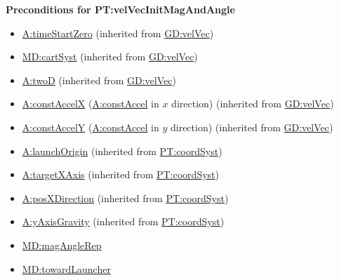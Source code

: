 \documentclass[12pt]{article}
\begin{document}
\noindent \textbf{Preconditions for PT:velVecInitMagAndAngle}
\begin{itemize}
\item \hyperref[timeStartZero]{A:timeStartZero} (inherited from \hyperref[GD:velVec]{GD:velVec})
\item \hyperref[MD:cartSyst]{MD:cartSyst} (inherited from \hyperref[GD:velVec]{GD:velVec})
\item \hyperref[twoD]{A:twoD} (inherited from \hyperref[GD:velVec]{GD:velVec})
\item \hyperref[constAccelX]{A:constAccelX} (\hyperref[constAccel]{A:constAccel}
in $x$ direction) (inherited from \hyperref[GD:velVec]{GD:velVec})
\item \hyperref[constAccelY]{A:constAccelY} (\hyperref[constAccel]{A:constAccel}
in $y$ direction) (inherited from \hyperref[GD:velVec]{GD:velVec})
\item \hyperref[launchOrigin]{A:launchOrigin} (inherited from \hyperref[PT:coordSyst]{PT:coordSyst})
\item \hyperref[targetXAxis]{A:targetXAxis} (inherited from \hyperref[PT:coordSyst]{PT:coordSyst})
\item \hyperref[posXDirection]{A:posXDirection} (inherited from \hyperref[PT:coordSyst]{PT:coordSyst})
\item \hyperref[yAxisGravity]{A:yAxisGravity} (inherited from \hyperref[PT:coordSyst]{PT:coordSyst})
\item \hyperref[MD:magAngleRep]{MD:magAngleRep}
\item \hyperref[MD:towardLauncher]{MD:towardLauncher}
\end{itemize}
\end{document}
